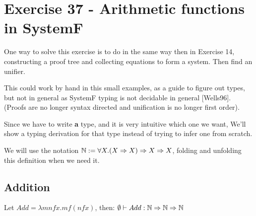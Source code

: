 \newcommand{\NatF}
           {\forall X. (X \Rightarrow X) \Rightarrow X \Rightarrow X}

           
\newcommand{\Arr}
           {\Rightarrow}

           
\section{Exercise 37 - Arithmetic functions in SystemF}

One way to solve this exercise is to do in the same way then in Exercise
14, constructing a proof tree and collecting equations
to form a system. Then find an unifier.

This could work by hand in this small examples, as a guide to figure out
types, but not in general as SystemF typing is not decidable in general
[Wells96]. %
(Proofs are no longer syntax directed and unification is no longer first
order).

Since we have to write {\bf a} type, and it is very intuitive which one
we want, We'll show a typing derivation for that type instead of trying
to infer one from scratch.



We will use the notation
$\N := \NatF$, folding and unfolding this definition when we
need it.

\subsection*{Addition}


\begin{theorem}
  Let $Add = \lambda m n f x . m f (n f x)$, then:
  $\emptyset \vdash Add : \N \Arr \N \Arr \N$
\end{theorem}

\newenvironment{scprooftree}[1]%
  {\gdef\scalefactor{#1}\begin{center}\proofSkipAmount \leavevmode}%
  {\scalebox{\scalefactor}{\DisplayProof}\proofSkipAmount \end{center} }


